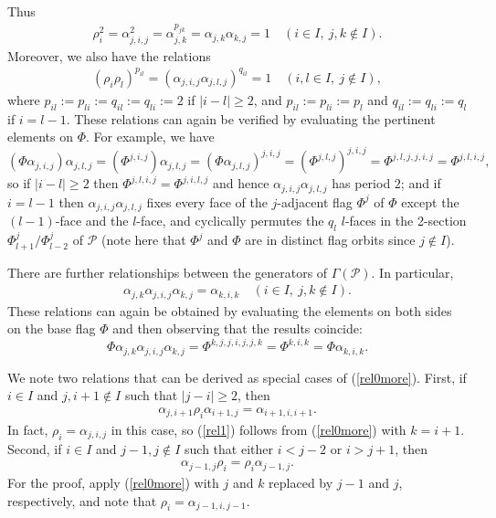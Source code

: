 \documentclass[12pt]{article}
\renewcommand{\>}{\rangle}
\renewcommand{\geq}{\geqslant}
\theoremstyle{definition}\newtheorem{definition}{Definition}[section]
\begin{document}
Thus
\begin{eqnarray}
\label{rel0}
\rho_i^2=\alpha_{j,i,j}^2 = \alpha^{p_{jk}}_{j,k} = \alpha_{j,k}\alpha_{k,j}  = 1 \quad (i\in I,\ \! j,k\notin I).
\end{eqnarray}
Moreover, we also have the relations
\begin{eqnarray}
\label{relations2}
(\rho_{i}\rho_{l})^{p_{il}} = (\alpha_{j,i,j} \alpha_{j,l,j})^{q_{il}} = 1 \quad (i,l\in I,\ \! j \notin I),
\end{eqnarray}
where $p_{il}:=p_{li}:=q_{il}:=q_{li}:=2$ if $|i-l | \geq 2$, and $p_{il}:=p_{li}:=p_l$ and $q_{il}:=q_{li}:=q_l$ if $i=l-1$. These relations can again be verified by evaluating the pertinent elements on $\Phi$. For example, we have 
\[ (\Phi\alpha_{j,i,j})\alpha_{j,l,j}=(\Phi^{j,i,j})\alpha_{j,l,j}
=(\Phi\alpha_{j,l,j})^{j,i,j}=(\Phi^{j,l,j})^{j,i,j} = \Phi^{j,l,j,j,i,j}=\Phi^{j,l,i,j},\]
so if $|i - l | \geq 2$ then $\Phi^{j,l,i,j}=\Phi^{j,i,l,j}$ and hence $\alpha_{j,i,j}\alpha_{j,l,j}$ has period $2$; and if $i=l-1$ then $\alpha_{j,i,j}\alpha_{j,l,j}$ fixes every face of the $j$-adjacent flag $\Phi^j$ of $\Phi$ except the $(l-1)$-face and the $l$-face, and cyclically permutes the $q_l$ $l$-faces in the 2-section $\Phi^{j}_{l+1}/\Phi^{j}_{l-2}$ of $\mathcal{P}$ (note here that $\Phi^j$ and $\Phi$ are in distinct flag orbits since $j\notin I$).

There are further relationships between the generators of $\Gamma(\mathcal{P})$. In particular, 
\begin{eqnarray}
\label{rel0more}
\alpha_{j,k} \alpha_{j,i,j} \alpha_{k,j} = \alpha_{k,i,k} \quad (i\in I,\ j,k\notin I).
\end{eqnarray}
These relations can again be obtained by evaluating the elements on both sides on the base flag $\Phi$ and then observing that the results coincide:
\[\Phi\alpha_{j,k} \alpha_{j,i,j} \alpha_{k,j} = \Phi^{k,j,j,i,j,j,k}=\Phi^{k,i,k}=\Phi\alpha_{k,i,k}.\]

We note two relations that can be derived as special cases of (\ref{rel0more}). First, if $i\in I$ and $j,i+1\notin I$ such that $|j-i| \geq 2$, then
\begin{eqnarray}
\label{rel1}
\alpha_{j,i+1} \rho_{i} \alpha_{i+1,j} = \alpha_{i+1,i,i+1}.
\end{eqnarray}
In fact, $\rho_{i}=\alpha_{j,i,j}$ in this case, so (\ref{rel1}) follows from (\ref{rel0more}) with $k=i+1$. Second, if $i \in I$ and $j-1,j \notin I$ such that either $i < j-2$ or $i > j+1$, then
\begin{eqnarray}
\label{rel2}
\alpha_{j-1,j} \rho_i = \rho_i \alpha_{j-1,j}.
\end{eqnarray}
For the proof, apply (\ref{rel0more}) with $j$ and $k$ replaced by $j-1$ and $j$, respectively, and note that $\rho_{i}=\alpha_{j-1,i,j-1}$.
\smallskip
\end{document}
